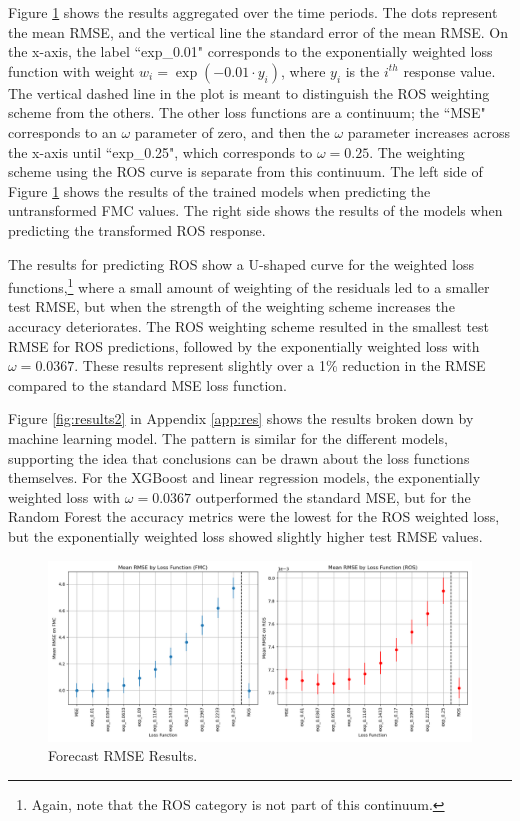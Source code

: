 \documentclass[11pt]{article}%
\begin{document}
Figure \ref{fig:results1} shows the results aggregated over the time periods. The dots represent the mean RMSE, and the vertical line the standard error of the mean RMSE. On the x-axis, the label ``exp\_0.01" corresponds to the exponentially weighted loss function with weight $w_i = \exp(-0.01\cdot y_i)$, where $y_i$ is the $i^{th}$ response value. The vertical dashed line in the plot is meant to distinguish the ROS weighting scheme from the others. The other loss functions are a continuum; the ``MSE" corresponds to an $\omega$ parameter of zero, and then the $\omega$ parameter increases across the x-axis until ``exp\_0.25", which corresponds to $\omega=0.25$. The weighting scheme using the ROS curve is separate from this continuum. The left side of Figure \ref{fig:results1} shows the results of the trained models when predicting the untransformed FMC values. The right side shows the results of the models when predicting the transformed ROS response.

The results for predicting ROS show a U-shaped curve for the weighted loss functions,\footnote{Again, note that the ROS category is not part of this continuum.} where a small amount of weighting of the residuals led to a smaller test RMSE, but when the strength of the weighting scheme increases the accuracy deteriorates. The ROS weighting scheme resulted in the smallest test RMSE for ROS predictions, followed by the exponentially weighted loss with $\omega = 0.0367$. These results represent slightly over a 1\% reduction in the RMSE compared to the standard MSE loss function. 

Figure \ref{fig:results2} in Appendix \ref{app:res} shows the results broken down by machine learning model. The pattern is similar for the different models, supporting the idea that conclusions can be drawn about the loss functions themselves. For the XGBoost and linear regression models, the exponentially weighted loss with $\omega = 0.0367$ outperformed the standard MSE, but for the Random Forest the accuracy metrics were the lowest for the ROS weighted loss, but the exponentially weighted loss showed slightly higher test RMSE values. 

\begin{figure}[ht]
    \centering
    \includegraphics[width=1\textwidth]{images/results1.png}
    \caption{Forecast RMSE Results.}
    \label{fig:results1}
\end{figure}
\end{document}
